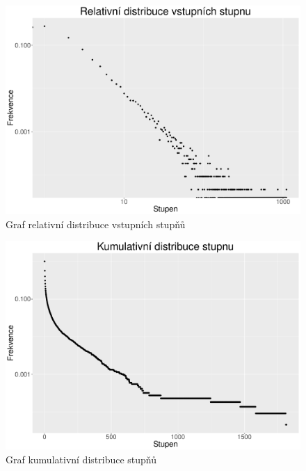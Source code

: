 \documentclass[a4paper,12pt]{article}
\begin{document}
\begin{figure}[h!]
\centering
\includegraphics[scale=0.4]{images/in_deg_rel.pdf}
\caption{Graf relativní distribuce vstupních stupňů}
\label{img:in_deg_rel}
\end{figure}

\begin{figure}[h!]
\centering
\includegraphics[scale=0.4]{images/all_deg_cum.pdf}
\caption{Graf kumulativní distribuce stupňů}
\label{img:all_deg_cum}
\end{figure}
\end{document}
